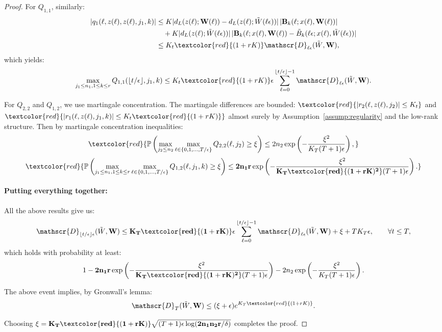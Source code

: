 \begin{proof}
For $Q_{1,1}$, similarly:
\begin{align*}
|q_1(\ell, z(\ell), z(\ell), j_1, k)| &\le K|d_L(z(\ell); \mathbf{W}(\ell)) - d_L(z(\ell); \tilde{W}(\ell\epsilon))|\,|\mathbf{B}_k(\ell; x(\ell), \mathbf{W}(\ell))|\\
&\quad + K|d_L(z(\ell); \tilde{W}(\ell\epsilon))|\,|\mathbf{B}_k(\ell; x(\ell), \mathbf{W}(\ell)) - \tilde{B}_k(\ell\epsilon; x(\ell), \tilde{W}(\ell\epsilon))|\\
&\le K_t\textcolor{red}{(1+rK)}\mathscr{D}_{\ell\epsilon}(\tilde{W}, \mathbf{W}),
\end{align*}
which yields:
\[
\max_{j_1 \le n_1, 1 \le k \le r}Q_{1,1}(\lfloor t/\epsilon\rfloor, j_1, k) \le K_t\textcolor{red}{(1+rK)}\epsilon\sum_{\ell=0}^{\lfloor t/\epsilon\rfloor - 1}\mathscr{D}_{\ell\epsilon}(\tilde{W}, \mathbf{W}).
\]

For $Q_{2,2}$ and $Q_{1,2}$, we use martingale concentration. The martingale differences are bounded: $\textcolor{red}{|r_2(\ell, z(\ell), j_2)| \le K_t}$ and $\textcolor{red}{|r_1(\ell, z(\ell), j_1, k)| \le K_t\textcolor{red}{(1+rK)}}$ almost surely by Assumption~\ref{assump:regularity} and the low-rank structure. Then by martingale concentration inequalities:
\[
\textcolor{red}{\mathbb{P}\left(\max_{j_2 \le n_2}\max_{\ell \in \{0,1,\ldots,T/\epsilon\}}Q_{2,2}(\ell, j_2) \ge \xi\right) \le 2n_2\exp\left(-\frac{\xi^2}{K_T(T+1)\epsilon}\right),}
\]
\[
\textcolor{red}{\mathbb{P}\left(\max_{j_1 \le n_1, 1 \le k \le r}\max_{\ell \in \{0,1,\ldots,T/\epsilon\}}Q_{1,2}(\ell, j_1, k) \ge \xi\right) \le \mathbf{2n_1r}\exp\left(-\frac{\xi^2}{\mathbf{K_T\textcolor{red}{(1+rK)^2}}(T+1)\epsilon}\right).}
\]

\paragraph*{Putting everything together:}

All the above results give us:
\[
\mathscr{D}_{\lfloor t/\epsilon\rfloor\epsilon}(\tilde{W}, \mathbf{W}) \le \mathbf{K_T\textcolor{red}{(1+rK)}}\epsilon\sum_{\ell=0}^{\lfloor t/\epsilon\rfloor - 1}\mathscr{D}_{\ell\epsilon}(\tilde{W}, \mathbf{W}) + \xi + TK_T\epsilon, \qquad \forall t \le T,
\]
which holds with probability at least:
\[
1 - \mathbf{2n_1r}\exp\left(-\frac{\xi^2}{\mathbf{K_T\textcolor{red}{(1+rK)^2}}(T+1)\epsilon}\right) - 2n_2\exp\left(-\frac{\xi^2}{K_T(T+1)\epsilon}\right).
\]

The above event implies, by Gronwall's lemma:
\[
\mathscr{D}_T(\tilde{W}, \mathbf{W}) \le (\xi + \epsilon)e^{K_T\textcolor{red}{(1+rK)}}.
\]

Choosing $\xi = \mathbf{K_T\textcolor{red}{(1+rK)}}\sqrt{(T+1)\epsilon\log(\mathbf{2n_1n_2r}/\delta)}$ completes the proof.
\end{proof}

